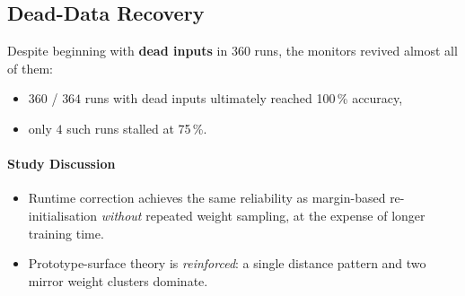 \subsection*{Dead-Data Recovery}
Despite beginning with \textbf{dead inputs} in 360 runs, the monitors
revived almost all of them:

\begin{itemize}
  \item $360$ / $364$ runs with dead inputs ultimately reached
        100\,\% accuracy,
  \item only $4$ such runs stalled at 75\,\%.
\end{itemize}

\paragraph{Study Discussion}
\begin{itemize}
  \item Runtime correction achieves the same reliability as
        margin-based re-initialisation \emph{without} repeated weight
        sampling, at the expense of longer training time.
  \item Prototype-surface theory is \emph{reinforced}: a single distance
        pattern and two mirror weight clusters dominate.
\end{itemize}

\hrulefill

